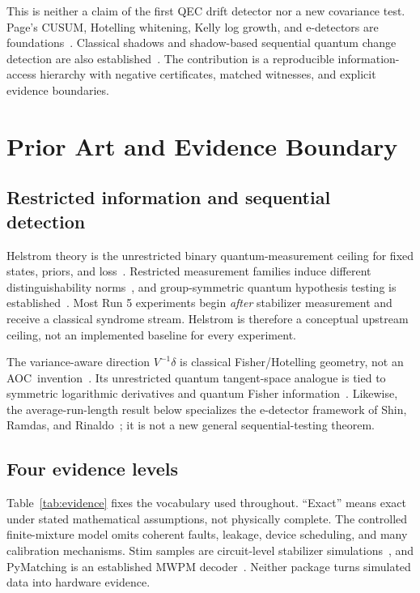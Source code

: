 \documentclass[letterpaper,journal]{IEEEtran}
\newcommand{\AOC}{\textsc{AOC}}
\begin{document}
This is neither a claim of the first QEC drift detector nor a new covariance
test. Page's CUSUM, Hotelling whitening, Kelly log growth, and e-detectors are
foundations~\cite{page1954,hotelling1931,kelly1956,shin2024}. Classical
shadows and shadow-based sequential quantum change detection are also
established~\cite{huang2020,zecchin2026}. The contribution is a reproducible
information-access hierarchy with negative certificates, matched witnesses,
and explicit evidence boundaries.

\section{Prior Art and Evidence Boundary}

\subsection{Restricted information and sequential detection}

Helstrom theory is the unrestricted binary quantum-measurement ceiling for
fixed states, priors, and loss~\cite{helstrom1976}. Restricted measurement
families induce different distinguishability norms~\cite{matthews2009}, and
group-symmetric quantum hypothesis testing is established~\cite{hiai2009}.
Most Run 5 experiments begin \emph{after} stabilizer measurement and receive a
classical syndrome stream. Helstrom is therefore a conceptual upstream
ceiling, not an implemented baseline for every experiment.

The variance-aware direction $V^{-1}\delta$ is classical
Fisher/Hotelling geometry, not an \AOC\ invention~\cite{hotelling1931}. Its
unrestricted quantum tangent-space analogue is tied to symmetric logarithmic
derivatives and quantum Fisher information~\cite{braunstein1994}. Likewise,
the average-run-length result below specializes the e-detector framework of
Shin, Ramdas, and Rinaldo~\cite{shin2024}; it is not a new general
sequential-testing theorem.

\subsection{Four evidence levels}

Table~\ref{tab:evidence} fixes the vocabulary used throughout. ``Exact''
means exact under stated mathematical assumptions, not physically complete.
The controlled finite-mixture model omits coherent faults, leakage, device
scheduling, and many calibration mechanisms. Stim samples are circuit-level
stabilizer simulations~\cite{gidney2021}, and PyMatching is an established
MWPM decoder~\cite{higgott2022,higgott2025}. Neither package turns simulated
data into hardware evidence.
\end{document}
